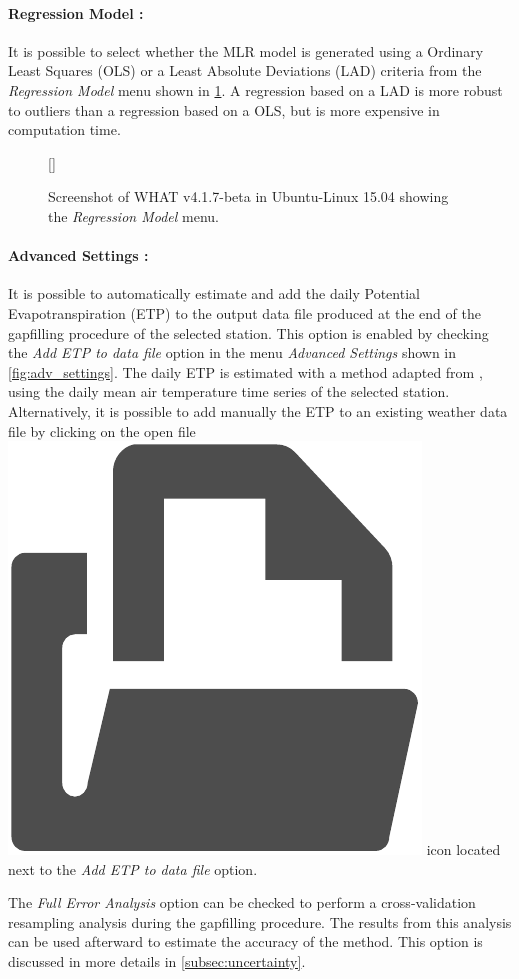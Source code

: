 \documentclass[WHATMANUAL.tex]{subfiles}
\begin{document}
\paragraph{Regression Model :} It is possible to select whether the MLR model is generated using a Ordinary Least Squares (OLS) or a Least Absolute Deviations (LAD) criteria from the \emph{Regression Model} menu shown in \cref{fig:regression_model}. A regression based on a LAD is more robust to outliers than a regression based on a OLS, but is more expensive in computation time.

\begin{figure}[!ht]
    \setlength{\fboxsep}{0pt}
    [\FBwidth]
	{
	 \caption{Screenshot of WHAT v4.1.7-beta in Ubuntu-Linux 15.04 showing the \emph{Regression Model} menu.}
	 \label{fig:regression_model}
	}
	{
	}
\end{figure}

\paragraph{Advanced Settings :} It is possible to automatically estimate and add the daily Potential Evapotranspiration (ETP) to the output data file produced at the end of the gapfilling procedure of the selected station. This option is enabled by checking the \emph{Add ETP to data file} option in the menu \emph{Advanced Settings} shown in \cref{fig:adv_settings}. The daily ETP is estimated with a method adapted from \cite{thornthwaite_approach_1948}, using the daily mean air temperature time series of the selected station. Alternatively, it is possible to add manually the ETP to an existing weather data file by clicking on the open file~{\includegraphics[height=2ex]{img/open_file}} icon located next to the \emph{Add ETP to data file} option.

The \emph{Full Error Analysis} option can be checked to perform a cross-validation resampling analysis during the gapfilling procedure. The results from this analysis can be used afterward to estimate the accuracy of the method. This option is discussed in more details in \cref{subsec:uncertainty}.
\end{document}
